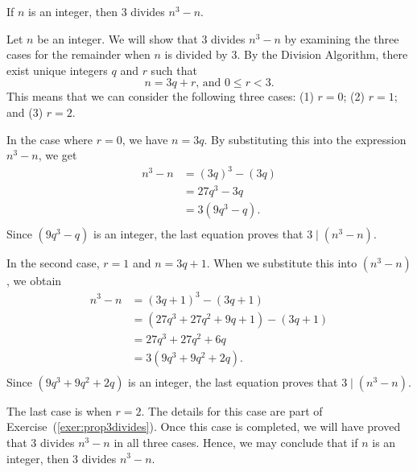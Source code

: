 \begin{proposition}\label{P:3divides}
If $n$ is an integer, then 3 divides $n^3-n$.
\end{proposition}
\begin{myproof}
Let $n$ be an integer.  We will show that 3 divides $n^3-n$ by examining the three cases for the remainder when $n$ is divided by 3.  By the Division Algorithm, there exist unique integers  $q$  and  $r$  such that
\[
n = 3q + r\text{, and  }0 \leq r < 3.
\]
This means that we can consider the following three cases:  (1)  $r = 0$;  (2)  $r = 1$;  and 
 (3)  $r = 2$.

In the case where $r = 0$, we have $n = 3q$.  By substituting this into the expression  $n^3  - n$, we get
\[
\begin{aligned}
  n^3  - n &= \left( {3q} \right)^3  - \left( {3q} \right) \\ 
   &= 27q^3  - 3q \\ 
   &= 3\left( {9q^3  - q} \right). \\ 
\end{aligned} 
\]
Since $\left( {9q^3 -q} \right)$ is an integer, the last equation proves that 
$3 \mid \left( n^3 - n \right)$.

In the second case,  $r = 1$ and $n = 3q + 1$.  When we substitute this into 
$\left( n^3 - n \right)$, we obtain
\[
\begin{aligned}
  n^3  - n &= \left( {3q + 1} \right)^3  - \left( {3q + 1} \right) \\ 
           &= \left( 27q^3 + 27q^2 +9q + 1\right) - \left( 3q + 1 \right) \\
           &= 27q^3 + 27q^2 + 6q \\                            
           &= 3 \left( 9q^3 + 9q^2 + 2q \right). \\
\end{aligned} 
\]
Since $\left( {9q^3 +9q^2 + 2q} \right)$ is an integer, the last equation proves that 
$3 \mid \left( n^3 - n \right)$.

The last case is when $r = 2$.  The details for this case are part of Exercise~(\ref{exer:prop3divides}).
Once this case is completed, we will have proved that  3 divides  $n^3  - n$ in all three cases.  Hence, we may conclude that if  $n$  is an integer, then  3  divides  $n^3  - n$.
\end{myproof}
%

\hbreak

\endinput
